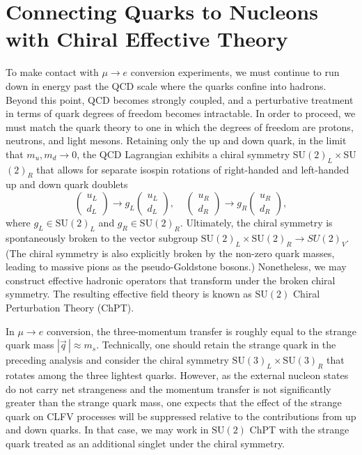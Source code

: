 \documentclass{book}[letterpaper,12pt]
\begin{document}
\section{Connecting Quarks to Nucleons with Chiral Effective Theory}
\label{sec:quarks_2_nucleons}
To make contact with $\mu\rightarrow e$ conversion experiments, we must continue to run down in energy past the QCD scale where the quarks confine into hadrons. Beyond this point, QCD becomes strongly coupled, and a perturbative treatment in terms of quark degrees of freedom becomes intractable. In order to proceed, we must match the quark theory to one in which the degrees of freedom are protons, neutrons, and light mesons. Retaining only the up and down quark, in the limit that $m_u,m_d\rightarrow 0$, the QCD Lagrangian exhibits a chiral symmetry SU$(2)_L\times$SU$(2)_R$ that allows for separate isospin rotations of right-handed and left-handed up and down quark doublets
\begin{equation}
\left(\begin{array}{c}
u_L\\
d_L
\end{array}\right)\rightarrow g_L\left(\begin{array}{c}
u_L\\
d_L
\end{array}\right),\;\;\;\;\left(\begin{array}{c}
u_R\\
d_R
\end{array}\right)\rightarrow g_R\left(\begin{array}{c}
u_R\\
d_R
\end{array}\right),
\end{equation}
where $g_L\in\mathrm{SU}(2)_L$ and $g_R\in\mathrm{SU}(2)_R$. Ultimately, the chiral symmetry is spontaneously broken to the vector subgroup $\mathrm{SU}(2)_L\times\mathrm{SU}(2)_R\rightarrow SU(2)_V$. (The chiral symmetry is also explicitly broken by the non-zero quark masses, leading to massive pions as the pseudo-Goldstone bosons.) Nonetheless, we may construct effective hadronic operators that transform under the broken chiral symmetry. The resulting effective field theory is known as $\mathrm{SU}(2)$ Chiral Perturbation Theory (ChPT).

In $\mu\rightarrow e$ conversion, the three-momentum transfer is roughly equal to the strange quark mass $|\vec{q}\,|\approx m_s$. Technically, one should retain the strange quark in the preceding analysis and consider the  chiral symmetry $\mathrm{SU}(3)_L\times\mathrm{SU}(3)_R$ that rotates among the three lightest quarks. However, as the external nucleon states do not carry net strangeness and the momentum transfer is not significantly greater than the strange quark mass, one expects that the effect of the strange quark on CLFV processes will be suppressed relative to the contributions from up and down quarks. In that case, we may work in $\mathrm{SU}(2)$ ChPT with the strange quark treated as an additional singlet under the chiral symmetry.
\end{document}
